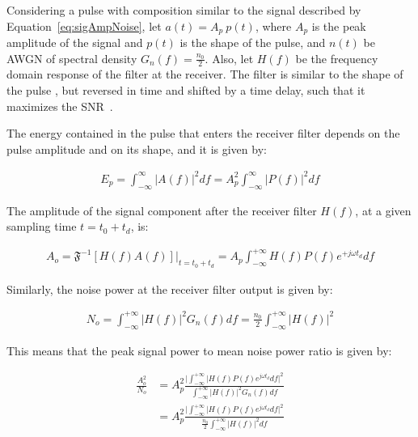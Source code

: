 \begin{refsection}
Considering a pulse with composition similar to the signal described by Equation~\ref{eq:sigAmpNoise}, let $ a(t) = A_p~p(t) $, where $A_p$ is the peak amplitude of the signal and $p(t)$ is the shape of the pulse, and $n(t)$ be AWGN of spectral density $G_n(f) = \frac{n_0}{2}$. Also, let $H(f)$ be the frequency domain response of the filter at the receiver.
The filter is similar to the shape of the pulse , but reversed in time and shifted by a time delay, such that it maximizes the SNR~\cite{carlson1986communication}.

The energy contained in the pulse that enters the receiver filter depends on the pulse amplitude and on its shape, and it is given by:

\begin{eqnarray}\label{eq:pulseEnergy}
E_p = \int_{-\infty}^{\infty} {|A(f)|}^2 df = A_p^2 \int_{-\infty}^{\infty} {|P(f)|}^2 df  
\end{eqnarray}

The amplitude of the signal component after the receiver filter $H(f)$, at a given sampling time $t=t_0+t_d$, is:

\begin{eqnarray}
A_o = \mathfrak{F}^{-1}\left[H(f) A(f)\right]\big|_{t=t_0+t_d} = A_p \int_{-\infty}^{+\infty} H(f) P(f) e^{+j \omega t_d}df
\end{eqnarray}

Similarly, the noise power at the receiver filter output is given by:

\begin{eqnarray}
N_o = \int_{-\infty}^{+\infty} {|H(f)|}^2 G_n(f) df = \frac{n_0}{2} \int_{-\infty}^{+\infty} {|H(f)|}^2
\end{eqnarray}

This means that the peak signal power to mean noise power ratio is given by:

\begin{eqnarray}
\frac{A_o^2}{N_o} &= A_p^2 \frac{\big|\int_{-\infty}^{+\infty} |H(f) P(f)e^{j\omega t_d} df\big|^2}{\int_{-\infty}^{+\infty} {|H(f)|}^2 G_n(f) df}\\\nonumber
				  &= A_p^2 \frac{\big|\int_{-\infty}^{+\infty} |H(f) P(f)e^{j\omega t_d} df\big|^2}{\frac{n_0}{2}\int_{-\infty}^{+\infty} {|H(f)|}^2df}
\end{eqnarray}


\end{refsection}
